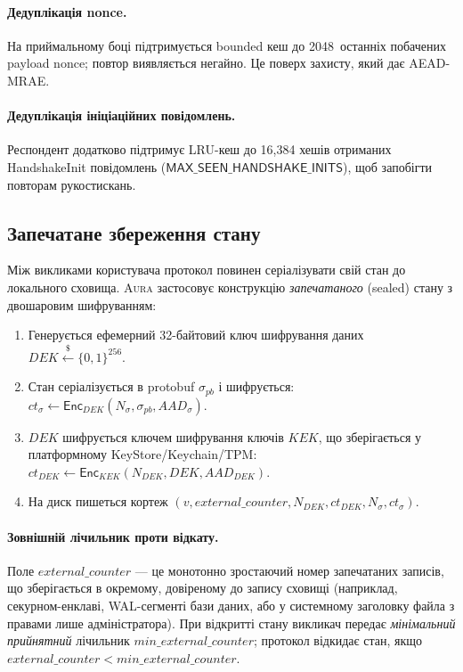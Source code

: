 \documentclass[11pt,a4paper]{article}
\theoremstyle{definition}
\newcommand{\Enc}{\textsf{Enc}}
\newcommand{\getsr}{\ensuremath{\stackrel{\$}{\gets}}}
\newcommand{\Aura}{\mbox{\normalfont\scshape Aura}}
\begin{document}
\paragraph{Дедуплікація nonce.}
На приймальному боці підтримується bounded кеш до 2048~останніх побачених
payload nonce; повтор виявляється негайно.
Це поверх захисту, який дає AEAD-MRAE.

\paragraph{Дедуплікація ініціаційних повідомлень.}
Респондент додатково підтримує LRU-кеш до 16{,}384 хешів отриманих
\textsf{HandshakeInit} повідомлень
($\textsf{MAX\_SEEN\_HANDSHAKE\_INITS}$), щоб запобігти повторам
рукостискань.

\subsection{Запечатане збереження стану}\label{sec:sealed}

Між викликами користувача протокол повинен серіалізувати свій стан
до локального сховища. \Aura{} застосовує конструкцію
\emph{запечатаного} (sealed) стану з двошаровим шифруванням:

\begin{enumerate}
  \item Генерується ефемерний 32-байтовий ключ шифрування даних
    $\mathit{DEK} \getsr \{0,1\}^{256}$.
  \item Стан серіалізується в protobuf $\sigma_{\mathit{pb}}$ і
    шифрується: $\mathit{ct}_{\sigma} \gets \Enc_{\mathit{DEK}}(N_{\sigma},
    \sigma_{\mathit{pb}}, \mathit{AAD}_{\sigma})$.
  \item $\mathit{DEK}$ шифрується ключем шифрування ключів
    $\mathit{KEK}$, що зберігається у платформному
    KeyStore/Keychain/TPM: $\mathit{ct}_{\mathit{DEK}} \gets
    \Enc_{\mathit{KEK}}(N_{\mathit{DEK}}, \mathit{DEK}, \mathit{AAD}_{\mathit{DEK}})$.
  \item На диск пишеться кортеж $(v, \mathit{external\_counter}, N_{\mathit{DEK}},
    \mathit{ct}_{\mathit{DEK}}, N_{\sigma}, \mathit{ct}_{\sigma})$.
\end{enumerate}

\paragraph{Зовнішній лічильник проти відкату.}
Поле $\mathit{external\_counter}$ — це монотонно зростаючий
номер запечатаних записів, що зберігається в окремому,
довіреному до запису сховищі (наприклад, секурном-енклаві,
WAL-сегменті бази даних, або у системному заголовку файла з
правами лише адміністратора). При відкритті стану викликач передає
\emph{мінімальний прийнятний} лічильник $\mathit{min\_external\_counter}$;
протокол відкидає стан, якщо $\mathit{external\_counter} <
\mathit{min\_external\_counter}$.
\end{document}
